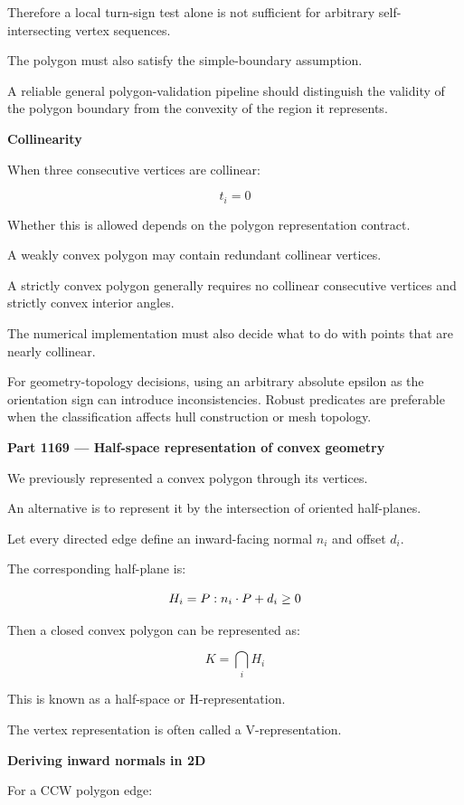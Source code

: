 Therefore a local turn-sign test alone is not sufficient for arbitrary self-intersecting vertex sequences.

The polygon must also satisfy the simple-boundary assumption.

A reliable general polygon-validation pipeline should distinguish the validity of the polygon boundary from the convexity of the region it represents.

\textbf{Collinearity}

When three consecutive vertices are collinear:

\[
t_i=0
\]

Whether this is allowed depends on the polygon representation contract.

A weakly convex polygon may contain redundant collinear vertices.

A strictly convex polygon generally requires no collinear consecutive vertices and strictly convex interior angles.

The numerical implementation must also decide what to do with points that are nearly collinear.

For geometry-topology decisions, using an arbitrary absolute epsilon as the orientation sign can introduce inconsistencies. Robust predicates are preferable when the classification affects hull construction or mesh topology.

\textbf{Part 1169 --- Half-space representation of convex geometry}

We previously represented a convex polygon through its vertices.

An alternative is to represent it by the intersection of oriented half-planes.

Let every directed edge define an inward-facing normal \(n_i\) and offset \(d_i\).

The corresponding half-plane is:

\[
H_i=\\{P:n_i\cdot P+d_i\ge0\\}
\]

Then a closed convex polygon can be represented as:

\[
\boxed{ K=\bigcap_iH_i }
\]

This is known as a half-space or H-representation.

The vertex representation is often called a V-representation.

\textbf{Deriving inward normals in 2D}

For a CCW polygon edge:


